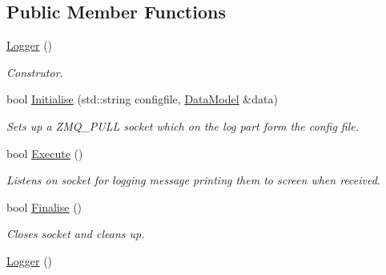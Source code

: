 \subsection*{Public Member Functions}
\begin{DoxyCompactItemize}
\item 
\hypertarget{classLogger_abc41bfb031d896170c7675fa96a6b30c}{\hyperlink{classLogger_abc41bfb031d896170c7675fa96a6b30c}{Logger} ()}\label{classLogger_abc41bfb031d896170c7675fa96a6b30c}

\begin{DoxyCompactList}\small\item\em Construtor. \end{DoxyCompactList}\item 
\hypertarget{classLogger_a1b598f35f454e24f9e9abc9f18c3e98f}{bool \hyperlink{classLogger_a1b598f35f454e24f9e9abc9f18c3e98f}{Initialise} (std\-::string configfile, \hyperlink{classDataModel}{Data\-Model} \&data)}\label{classLogger_a1b598f35f454e24f9e9abc9f18c3e98f}

\begin{DoxyCompactList}\small\item\em Sets up a Z\-M\-Q\-\_\-\-P\-U\-L\-L socket which on the log part form the config file. \end{DoxyCompactList}\item 
\hypertarget{classLogger_a140ebede2975159a5abe7c59e56ec0ec}{bool \hyperlink{classLogger_a140ebede2975159a5abe7c59e56ec0ec}{Execute} ()}\label{classLogger_a140ebede2975159a5abe7c59e56ec0ec}

\begin{DoxyCompactList}\small\item\em Listens on socket for logging message printing them to screen when received. \end{DoxyCompactList}\item 
\hypertarget{classLogger_a2c70367a86d5999db21324ccb58f44ed}{bool \hyperlink{classLogger_a2c70367a86d5999db21324ccb58f44ed}{Finalise} ()}\label{classLogger_a2c70367a86d5999db21324ccb58f44ed}

\begin{DoxyCompactList}\small\item\em Closes socket and cleans up. \end{DoxyCompactList}\item 
\hypertarget{classLogger_abc41bfb031d896170c7675fa96a6b30c}{\hyperlink{classLogger_abc41bfb031d896170c7675fa96a6b30c}{Logger} ()}\label{classLogger_abc41bfb031d896170c7675fa96a6b30c}


\end{DoxyCompactItemize}
